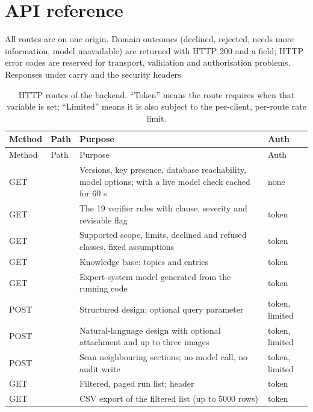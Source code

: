 \chapter{API reference}\label{ch:api}

All routes are on one origin. Domain outcomes (declined, rejected, needs more information, model unavailable) are returned with HTTP 200 and a  field; HTTP error codes are reserved for transport, validation and authorisation problems. Responses under  carry  and the security headers.

\begin{longtable}{@{}l L{4.0cm} L{6.1cm} L{2.0cm}@{}}
\caption{HTTP routes of the backend. ``Token'' means the route requires  when that variable is set; ``Limited'' means it is also subject to the per-client, per-route rate limit.}\label{tab:api}\\
\toprule Method & Path & Purpose & Auth \\ \midrule \endfirsthead
\toprule Method & Path & Purpose & Auth \\ \midrule \endhead
\bottomrule \endlastfoot
GET &  & Versions, key presence, database reachability, model options; with  a live model check cached for 60 s & none \\
GET &  & The 19 verifier rules with clause, severity and revisable flag & token \\
GET &  & Supported scope, limits, declined and refused classes, fixed assumptions & token \\
GET &  & Knowledge base: topics and entries & token \\
GET &  & Expert-system model generated from the running code & token \\
POST &  & Structured design; optional  query parameter & token, limited \\
POST &  & Natural-language design with optional attachment and up to three images & token, limited \\
POST &  & Scan neighbouring sections; no model call, no audit write & token, limited \\
GET &  & Filtered, paged run list;  header & token \\
GET &  & CSV export of the filtered list (up to 5000 rows) & token \\

\end{longtable}

